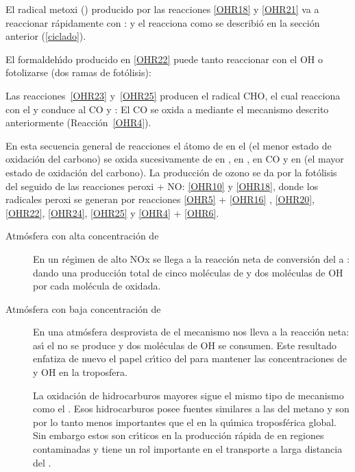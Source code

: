 El radical metoxi () producido por las reacciones \ref{OHR18} y \ref{OHR21} va a reaccionar r\'apidamente con :
y el  reacciona  como se describi\'o en la secci\'on anterior (\ref{ciclado}).

El formaldeh\'{\i}do producido en \ref{OHR22} puede tanto reaccionar con el OH o fotolizarse (dos ramas de fot\'olisis):

Las reacciones~\ref{OHR23} y~\ref{OHR25} producen el radical CHO, el cual reacciona con el  y conduce al CO y :
El CO se oxida a  mediante el mecanismo descrito anteriormente (Reacci\'on~\ref{OHR4}).

En esta secuencia general de reacciones el \'atomo de  en el  (el menor estado de oxidaci\'on del carbono) se oxida sucesivamente de  en ,  en ,  en CO y  en   (el mayor estado de oxidaci\'on del carbono). La producci\'on de ozono se da por la fot\'olisis del  seguido de las reacciones peroxi + NO: \ref{OHR10} y \ref{OHR18}, donde los radicales peroxi se generan por reacciones \ref{OHR5} + \ref{OHR16} , \ref{OHR20}, \ref{OHR22}, \ref{OHR24}, \ref{OHR25} y \ref{OHR4} + \ref{OHR6}.
\begin{description}
\item[Atm\'osfera con alta concentraci\'on de ]
En un r\'egimen de alto NOx se llega a la reacci\'on neta de conversi\'on del  a :
dando una producci\'on total de cinco mol\'eculas de  y dos mol\'eculas de OH por cada mol\'ecula de  oxidada.
\item[Atm\'osfera con baja concentraci\'on de ]
En una atm\'osfera desprovista de  el mecanismo nos lleva a la reacci\'on neta:
as\'{\i} el  no se produce y dos mol\'eculas de OH se consumen. Este resultado enfatiza de nuevo el papel cr\'{\i}tico del  para mantener las concentraciones de   y OH en la troposfera.

La oxidaci\'on de hidrocarburos mayores sigue el mismo tipo de mecanismo como el . Esos hidrocarburos posee fuentes similares a las del metano y son por lo tanto menos importantes que el  en la qu\'{\i}mica troposf\'erica global. Sin  embargo estos son cr\'{\i}ticos en la producci\'on r\'apida de   en regiones contaminadas y tiene un rol importante en el transporte a larga distancia del .
\end{description}

